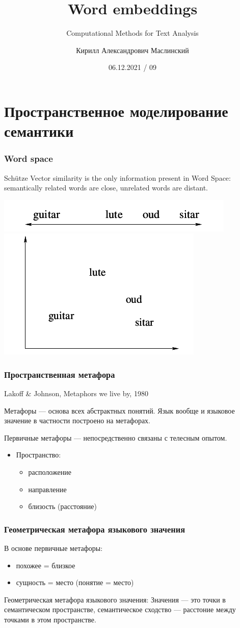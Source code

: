\documentclass[10pt,svgnames]{beamer}
\title[CMTA 09] %
{Word embeddings}
\subtitle
{Computational Methods for Text Analysis} %
\author%
{Кирилл Александрович Маслинский}
\institute%
{НИУ ВШЭ Санкт-Петербург}
\date%
{06.12.2021 / 09}
\begin{document}
\begin{frame}
  \titlepage
\end{frame}

\section{Пространственное моделирование семантики}


\begin{frame}
  \frametitle{Word space}
  \begin{block}{Sch\"utze}
    Vector similarity is the only information present in Word Space:
    semantically related words are close, unrelated words are
    distant.
  \end{block}
  \includegraphics[width=.5\textwidth]{guitar1}
  \includegraphics[width=.5\textwidth]{guitar2}
\end{frame}

\begin{frame}
  \frametitle{Пространственная метафора}
  Lakoff \& Johnson, Metaphors we live by, 1980

  Метафоры — основа всех абстрактных понятий. Язык вообще и языковое
  значение в частности построено на метафорах. 

  Первичные метафоры — непосредственно связаны с телесным опытом.
  \begin{itemize}
  \item Пространство:
    \begin{itemize}
    \item расположение
    \item направление
    \item близость (расстояние)
    \end{itemize}
  \end{itemize}
\end{frame}

\begin{frame}
  \frametitle{Геометрическая метафора языкового значения}
  В основе первичные метафоры:
  \begin{itemize}
  \item похожее = близкое
  \item сущность = место (понятие = место)
  \end{itemize}
  \begin{block}{Геометрическая метафора языкового значения:}
    Значения — это точки в семантическом пространстве, семантическое
    сходство — расстоние между точками в этом пространстве.
  \end{block}
\end{frame}
\end{document}
